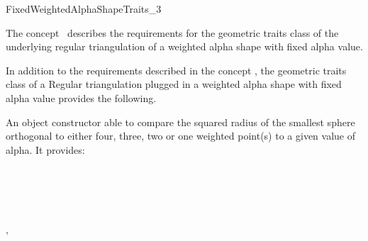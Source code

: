 \begin{ccRefConcept}{FixedWeightedAlphaShapeTraits_3}


\ccDefinition
  
The concept \ccRefName\ describes the requirements 
for the geometric traits class of  the underlying  regular triangulation of a weighted alpha shape with fixed alpha value.

\ccRefines
{}

In addition to the requirements described in the concept 
,
the geometric traits class of a
Regular triangulation plugged in a weighted alpha shape with fixed alpha value
provides the following.

\ccTypes
{}

{An object constructor able to compare the squared radius of the
 smallest sphere  orthogonal to either four, three, two or one weighted point(s)
 to a given value of alpha.
It provides:\\
\\
\\
\\
\\
} 

\ccCreation
{}  %


\ccAccessFunctions
{} {}


\ccHasModels

,

\end{ccRefConcept}

